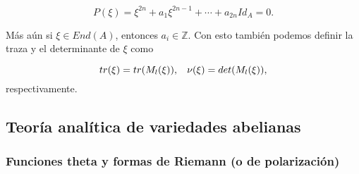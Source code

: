 \documentclass[letterpaper]{report}
\newcommand{\dbz}{\ensuremath{ \mathbb Z }}
\begin{document}
$$P(\xi)=\xi^{2n}+a_1\xi^{2n-1}+\cdots+a_{2n}Id_A=0.$$

\noindent Más aún si $\xi\in End(A)$, entonces $a_i\in\dbz$. Con esto también podemos definir la traza y el determinante de $\xi$ como

$$tr(\xi)=tr(M_l(\xi)),\hspace{0.3cm}\nu(\xi)=det(M_l(\xi)),$$
\noindent respectivamente.

\subsection*{Teoría analítica de variedades abelianas}

\subsubsection*{Funciones theta y formas de Riemann (o de polarización)}
\end{document}

